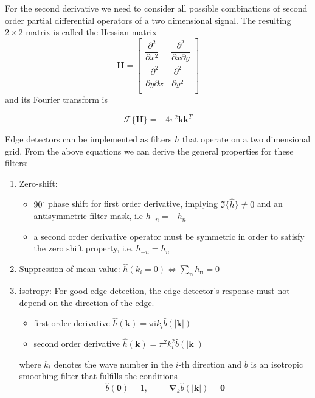 		For the second derivative we need to consider all possible combinations of second order partial differential operators of a two dimensional signal. The resulting $2 \times 2$ matrix is called the Hessian matrix
		\begin{equation}
			\mathbf{H} = 
				\begin{bmatrix}
   \dfrac{\partial^2}{\partial x^2}       & \dfrac{\partial^2}{\partial x \partial y}\\
   \dfrac{\partial^2}{\partial y \partial x}       & \dfrac{\partial^2}{\partial y^2}\\
				\end{bmatrix}
		\end{equation}
		and its Fourier transform is
		
		\begin{equation}
			\mathscr{F}\{\mathbf{H}\} = -4 \pi^2 \mathbf{k}\mathbf{k}^T
		\end{equation}
		
		
		Edge detectors can be implemented as filters $h$ that operate on a two dimensional grid. From the above equations we can derive the general properties for these filters:
		\begin{enumerate}
			\item Zero-shift: 
				\begin{itemize}
					\item $90^\circ$ phase shift for first order derivative, implying $ \Im\{ \hat{h} \} \neq 0$ and an antisymmetric filter mask, i.e $h_{-n} = -h_{n}$
					\item a second order derivative operator must be symmetric in order to satisfy the zero shift property, i.e. $h_{-n} = h_{n}$
				\end{itemize} 
				
			\item Suppression of mean value: $\hat{h}(k_i =0) \Leftrightarrow \sum_{\mathbf{n}}h_{\mathbf{n}} = 0$
			
			\item isotropy: For good edge detection, the edge detector's response must not depend on the direction of the edge. 
				\begin{itemize}
					\item first order derivative $\hat{h}(\mathbf{k}) = 
											\pi \text{i} k_i \hat{b} (|\mathbf{k}|)$
					\item second order derivative $\hat{h}(\mathbf{k}) = 
											\pi^2 k_i^2 \hat{b} (|\mathbf{k}|)$
				\end{itemize}
				where $k_i$ denotes the wave number in the $i$-th direction and $b$ is an isotropic smoothing filter that fulfills the conditions
				\begin{equation}
					\hat{b}(\mathbf{0}) = 1, \hspace{1cm} \mathbf{\nabla}_k \hat{b}(|\mathbf{k}|) = \mathbf{0}
				\end{equation}
		\end{enumerate}
			
